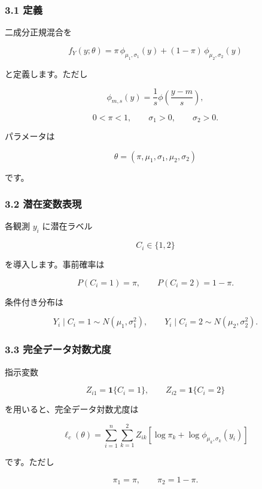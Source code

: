 \documentclass[
]{article}
\begin{document}
\hypertarget{ux5b9aux7fa9-1}{%
\subsubsection{3.1 定義}\label{ux5b9aux7fa9-1}}

二成分正規混合を

\[
f_Y(y;\theta)
= \pi\,\phi_{\mu_1,\sigma_1}(y)
+(1-\pi)\,\phi_{\mu_2,\sigma_2}(y)
\]

と定義します。ただし

\[
\phi_{m,s}(y)=\frac{1}{s}\phi\left(\frac{y-m}{s}\right),
\]

\[
0<\pi<1,
\qquad
\sigma_1>0,
\qquad
\sigma_2>0.
\]

パラメータは

\[
\theta=(\pi,\mu_1,\sigma_1,\mu_2,\sigma_2)
\]

です。

\hypertarget{ux6f5cux5728ux5909ux6570ux8868ux73fe}{%
\subsubsection{3.2
潜在変数表現}\label{ux6f5cux5728ux5909ux6570ux8868ux73fe}}

各観測 \(y_i\) に潜在ラベル

\[
C_i\in\{1,2\}
\]

を導入します。事前確率は

\[
P(C_i=1)=\pi,
\qquad
P(C_i=2)=1-\pi.
\]

条件付き分布は

\[
Y_i\mid C_i=1\sim N(\mu_1,\sigma_1^2),
\qquad
Y_i\mid C_i=2\sim N(\mu_2,\sigma_2^2).
\]

\hypertarget{ux5b8cux5168ux30c7ux30fcux30bfux5bfeux6570ux5c24ux5ea6}{%
\subsubsection{3.3
完全データ対数尤度}\label{ux5b8cux5168ux30c7ux30fcux30bfux5bfeux6570ux5c24ux5ea6}}

指示変数

\[
Z_{i1}=\mathbf{1}\{C_i=1\},
\qquad
Z_{i2}=\mathbf{1}\{C_i=2\}
\]

を用いると、完全データ対数尤度は

\[
\ell_c(\theta)
=\sum_{i=1}^{n}\sum_{k=1}^{2}Z_{ik}\left[\log\pi_k+
\log\phi_{\mu_k,\sigma_k}(y_i)\right]
\]

です。ただし

\[
\pi_1=\pi,
\qquad
\pi_2=1-\pi.
\]
\end{document}

